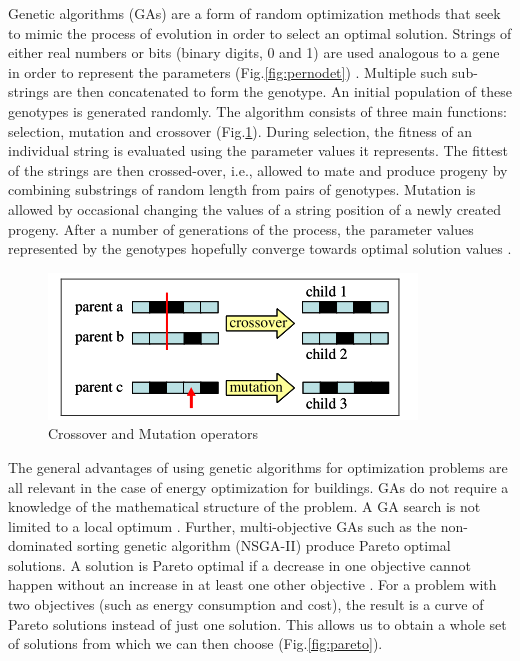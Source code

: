 Genetic algorithms (GAs) are a form of random optimization methods that seek to mimic the process of evolution in order to select an optimal solution. Strings of either real numbers or  bits (binary digits, 0 and 1) are used analogous to a gene in order to represent the parameters (Fig.\ref{fig:pernodet}) \cite{Pernodet2009} \cite{Coley2002}. Multiple such sub-strings are then concatenated to form the genotype. An initial population of these genotypes is generated randomly. The algorithm consists of three main functions: selection, mutation and crossover (Fig.\ref{fig:pernodet2}). During selection, the fitness of an individual string is evaluated using the parameter values it represents. The fittest of the strings are then crossed-over, i.e., allowed to mate and produce progeny by combining substrings of random length from pairs of genotypes. Mutation is allowed by occasional changing the values of a string position of a newly created progeny. After a number of generations of the process, the parameter values represented by the genotypes hopefully converge towards optimal solution values \cite{Coley2002}.

\begin{figure}[htbp]
\centering
\includegraphics[width =0.7\linewidth]{images/pernodet2.png}
\caption{Crossover and Mutation operators \cite{Pernodet2009}}
\label{fig:pernodet2}
\end{figure}


The general advantages of using genetic algorithms for optimization problems are all relevant in the case of energy optimization for buildings. GAs do not 
require a knowledge of the mathematical structure of the problem. A GA search is not limited to a local optimum \cite{Pernodet2009}. Further, multi-objective GAs such as the non-dominated sorting genetic algorithm (NSGA-II) produce Pareto optimal solutions. A solution is Pareto optimal if a decrease in one objective cannot happen without an increase in at least one other objective \cite{Deb2002}\cite{Pernodet2009}. For a problem with two objectives (such as energy consumption and cost), the result is a curve of Pareto solutions instead of just one solution. This allows us to obtain a whole set of solutions from which we can then choose (Fig.\ref{fig:pareto}). %

